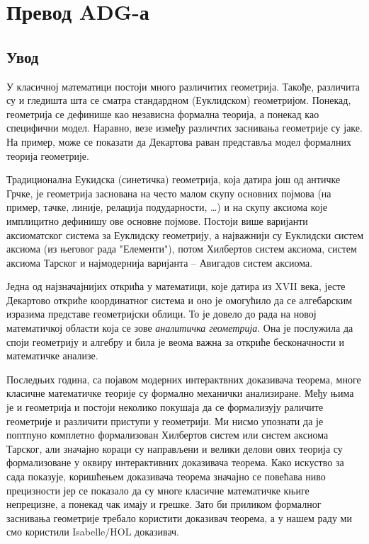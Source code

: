 \chapter{Превод ADG-а}

\section{Увод}
У класичној математици постоји много различитих геометрија. Такође,
различита су и гледишта шта се сматра стандардном (Еуклидском)
геометријом. Понекад, геометрија се дефинише као независна формална
теорија, а понекад као специфични модел. Наравно, везе између
различтих заснивања геометрије су јаке. На пример, може се показати да
Декартова раван представља модел формалних теорија геометрије.

Традиционална Еукидска (синетичка) геометрија, која датира још од
античке Грчке, је геометрија заснована на често малом скупу основних
појмова (на пример, тачке, линије, релација подударности, \ldots) и на
скупу аксиома које имплицитно дефинишу ове основне појмове.  Постоји
више варијанти аксиоматског система за Еуклидску геометрију, а
најважнији су Еуклидски систем аксиома (из његовог рада "Елементи"),
потом Хилбертов систем аксиома\cite{hilbert}, систем аксиома
Тарског\cite{tarski} и најмодернија варијанта -- Авигадов систем
аксиома\cite{avigad}.

Једна од најзначајнијих открића у математици, које датира из XVII
века, јесте Декартово откриће координатног система и оно је омогућило
да се алгебарским изразима представе геометријски облици. То је довело
до рада на новој математичкој области која се зове \emph{аналитичка
  геометрија}. Она је послужила да споји геометрију и алгебру и била
је веома важна за откриће бесконачности и математичке анализе.

Последњих година, са појавом модерних интерактвних доказивача теорема,
многе класичне математичке теорије су формално механички
анализиране. Међу њима је и геометрија и постоји неколико покушаја да
се формализују раличите геометрије и различити приступи у
геометрији. Ми нисмо упознати да је поптпуно комплетно формализован
Хилбертов систем\cite{hilbert} или систем аксиома
Тарског\cite{tarski}, али значајно кораци су направљени и велики
делови ових теорија су формализоване у оквиру интерактивних доказивача
теорема\cite{hilbert-isabelle,narboux,projective-coq1}.  Како искуство
за сада показује, коришћењем доказивача теорема значајно се повећава
ниво прецизности јер се показало да су многе класичне математичке
књиге непрецизне, а понекад чак имају и грешке. Зато би приликом
формалног заснивања геометрије требало користити доказивач теорема, а
у нашем раду ми смо користили Isabelle/HOL\cite{Isabelle} доказивач.

